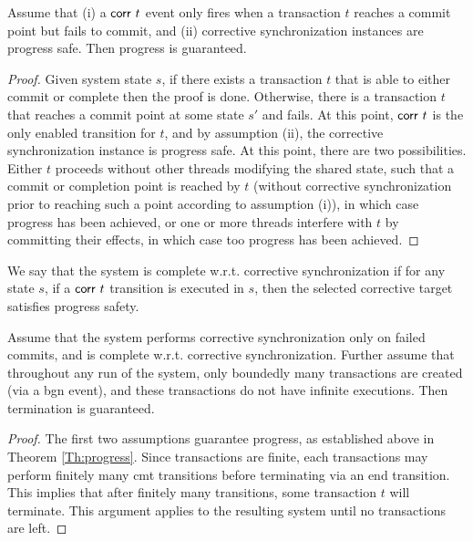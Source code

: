 \begin{theorem}[Progress]\label{Th:progress} Assume that (i) a ${\sf corr}\ t$ event only fires when a transaction $t$ reaches a commit point but fails to commit, and (ii) corrective synchronization instances are progress safe. Then progress is guaranteed.
	\begin{proof}
	Given system state $s$, if there exists a transaction $t$ that is able to either commit or complete then the proof is done. Otherwise, there is a transaction $t$ that reaches a commit point at some state $s'$ and fails. At this point, ${\sf corr}\ t$ is the only enabled transition for $t$, and by assumption (ii), the corrective synchronization instance is progress safe. At this point, there are two possibilities. Either $t$ proceeds without other threads modifying the shared state, such that a commit or completion point is reached by $t$ (without corrective synchronization prior to reaching such a point according to assumption (i)), in which case progress has been achieved, or one or more threads interfere with $t$ by committing their effects, in which case too progress has been achieved.
	\end{proof}
\end{theorem}

\begin{definition} 
	We say that the system is complete w.r.t. corrective synchronization if for any state $s$, if a ${\sf corr}\ t$ transition is executed in $s$, then the selected corrective target satisfies progress safety.
\end{definition}

\begin{lemma}[Termination]
	Assume that the system performs corrective synchronization only on failed commits, and is complete w.r.t. corrective synchronization. Further assume that throughout any run of the system, only boundedly many transactions are created (via a {\sf bgn} event), and these transactions do not have infinite executions. Then termination is guaranteed.
	\begin{proof}
		The first two assumptions guarantee progress, as established above in 
		Theorem \ref{Th:progress}. Since transactions are finite, each transactions may perform finitely many {\sf cmt} transitions before terminating via an {\sf end} transition. This implies that after finitely many transitions, some transaction $t$ will terminate. This argument applies to the resulting system until no transactions are left.
	\end{proof}
\end{lemma}

